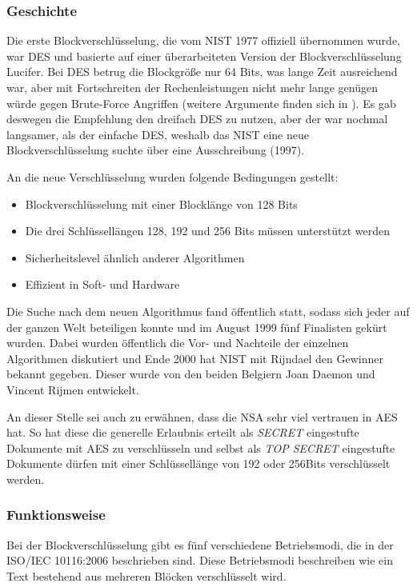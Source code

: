  \subsubsection{Geschichte}
 \label{aes-geschichte}
 Die erste Blockverschlüsselung, die vom \ac{NIST} 1977 offiziell übernommen wurde, war
 \ac{DES} und basierte auf einer überarbeiteten Version der Blockverschlüsselung Lucifer. Bei
 DES betrug die Blockgröße nur 64 Bits, was lange Zeit ausreichend war, aber mit Fortschreiten
 der Rechenleistungen nicht mehr lange genügen würde gegen Brute-Force Angriffen (weitere
 Argumente finden sich in \cite{paar10}). Es gab deswegen die Empfehlung den dreifach DES zu
 nutzen, aber der war nochmal langsamer, als der einfache DES, weshalb das NIST eine neue
 Blockverschlüsselung suchte über eine Ausschreibung (1997).
 
 An die neue Verschlüsselung wurden folgende Bedingungen gestellt:
\begin{itemize}
 \item Blockverschlüsselung mit einer Blocklänge von 128 Bits
 \item Die drei Schlüssellängen 128, 192 und 256 Bits müssen unterstützt werden
 \item Sicherheitslevel ähnlich anderer Algorithmen
 \item Effizient in Soft- und Hardware
\end{itemize} 

Die Suche nach dem neuen Algorithmus fand öffentlich statt, sodass sich jeder auf der ganzen
Welt beteiligen konnte und im August 1999 fünf Finalisten gekürt wurden. Dabei wurden
öffentlich die Vor- und Nachteile der einzelnen Algorithmen diskutiert und Ende 2000 hat NIST
mit Rijndael den Gewinner bekannt gegeben. Dieser wurde von den beiden Belgiern Joan
Daemon und Vincent Rijmen entwickelt.

An dieser Stelle sei auch zu erwähnen, dass die \ac{NSA} sehr viel vertrauen in AES hat. So hat
diese die generelle Erlaubnis erteilt als \emph{SECRET} eingestufte Dokumente mit AES zu
verschlüsseln und selbst als \emph{TOP SECRET} eingestufte Dokumente dürfen mit einer
Schlüssellänge von 192 oder 256Bits verschlüsselt werden. \cite{paar10}
 
 \subsubsection{Funktionsweise}
 \label{aes-funktion}
 Bei der Blockverschlüsselung gibt es fünf verschiedene Betriebsmodi, die in der ISO/IEC 10116:2006
 \cite{ISO10116} beschrieben sind. Diese Betriebsmodi beschreiben wie ein Text bestehend aus
 mehreren Blöcken verschlüsselt wird.
 
